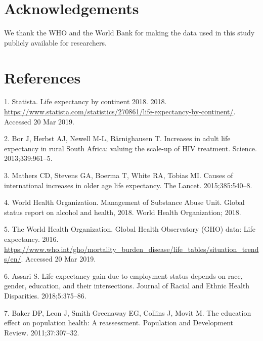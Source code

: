\documentclass[]{elsarticle} %
\begin{document}
\hypertarget{acknowledgements}{%
\section*{Acknowledgements}\label{acknowledgements}}

We thank the WHO and the World Bank for making the data used in this study publicly available for researchers.

\hypertarget{references}{%
\section*{References}\label{references}}

\hypertarget{refs}{}
\leavevmode\hypertarget{ref-Statista}{}%
1. Statista. Life expectancy by continent 2018. 2018. \url{https://www.statista.com/statistics/270861/life-expectancy-by-continent/}. Accessed 20 Mar 2019.

\leavevmode\hypertarget{ref-bor2013increases}{}%
2. Bor J, Herbst AJ, Newell M-L, Bärnighausen T. Increases in adult life expectancy in rural South Africa: valuing the scale-up of HIV treatment. Science. 2013;339:961--5.

\leavevmode\hypertarget{ref-mathers2015causes}{}%
3. Mathers CD, Stevens GA, Boerma T, White RA, Tobias MI. Causes of international increases in older age life expectancy. The Lancet. 2015;385:540--8.

\leavevmode\hypertarget{ref-world2018global}{}%
4. World Health Organization. Management of Substance Abuse Unit. Global status report on alcohol and health, 2018. World Health Organization; 2018.

\leavevmode\hypertarget{ref-WHOobserve}{}%
5. The World Health Organization. Global Health Observatory (GHO) data: Life expectancy. 2016. \url{https://www.who.int/gho/mortality_burden_disease/life_tables/situation_trends/en/}. Accessed 20 Mar 2019.

\leavevmode\hypertarget{ref-assari2018life}{}%
6. Assari S. Life expectancy gain due to employment status depends on race, gender, education, and their intersections. Journal of Racial and Ethnic Health Disparities. 2018;5:375--86.

\leavevmode\hypertarget{ref-baker2011education}{}%
7. Baker DP, Leon J, Smith Greenaway EG, Collins J, Movit M. The education effect on population health: A reassessment. Population and Development Review. 2011;37:307--32.
\end{document}
